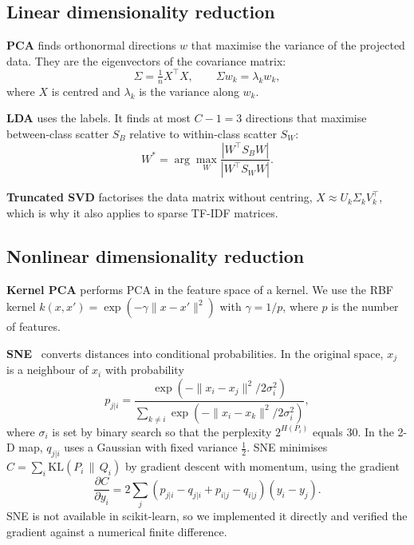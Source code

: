 \documentclass[conference]{IEEEtran}
\begin{document}
\subsection{Linear dimensionality reduction}
\textbf{PCA} finds orthonormal directions $w$ that maximise the variance of the projected data. They are the eigenvectors of the covariance matrix:
\begin{equation}
\Sigma = \tfrac{1}{n} X^\top X, \qquad \Sigma w_k = \lambda_k w_k,
\end{equation}
where $X$ is centred and $\lambda_k$ is the variance along $w_k$.

\textbf{LDA} uses the labels. It finds at most $C-1 = 3$ directions that maximise between-class scatter $S_B$ relative to within-class scatter $S_W$:
\begin{equation}
W^\ast = \arg\max_W \frac{\left| W^\top S_B W \right|}{\left| W^\top S_W W \right|}.
\end{equation}

\textbf{Truncated SVD} factorises the data matrix without centring, $X \approx U_k \Sigma_k V_k^\top$, which is why it also applies to sparse TF-IDF matrices.

\subsection{Nonlinear dimensionality reduction}
\textbf{Kernel PCA} performs PCA in the feature space of a kernel. We use the RBF kernel $k(x,x') = \exp(-\gamma \|x-x'\|^2)$ with $\gamma = 1/p$, where $p$ is the number of features.

\textbf{SNE}~\cite{hinton2002sne} converts distances into conditional probabilities. In the original space, $x_j$ is a neighbour of $x_i$ with probability
\begin{equation}
p_{j|i} = \frac{\exp(-\|x_i - x_j\|^2 / 2\sigma_i^2)}{\sum_{k \neq i} \exp(-\|x_i - x_k\|^2 / 2\sigma_i^2)},
\end{equation}
where $\sigma_i$ is set by binary search so that the perplexity $2^{H(P_i)}$ equals 30. In the 2-D map, $q_{j|i}$ uses a Gaussian with fixed variance $\tfrac{1}{2}$. SNE minimises $C = \sum_i \mathrm{KL}(P_i \,\|\, Q_i)$ by gradient descent with momentum, using the gradient
\begin{equation}
\frac{\partial C}{\partial y_i} = 2 \sum_j \left(p_{j|i} - q_{j|i} + p_{i|j} - q_{i|j}\right)(y_i - y_j).
\end{equation}
SNE is not available in scikit-learn, so we implemented it directly and verified the gradient against a numerical finite difference.
\end{document}
